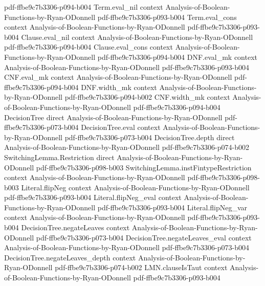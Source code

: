 \begin{theorem}
  {pdf-ffbe9c7b3306-p094-b004}
\proofstep
  {Term.eval_nil}
  {context}
  {Analysis-of-Boolean-Functions-by-Ryan-ODonnell}
  {pdf-ffbe9c7b3306-p093-b004}
\proofstep
  {Term.eval_cons}
  {context}
  {Analysis-of-Boolean-Functions-by-Ryan-ODonnell}
  {pdf-ffbe9c7b3306-p093-b004}
\proofstep
  {Clause.eval_nil}
  {context}
  {Analysis-of-Boolean-Functions-by-Ryan-ODonnell}
  {pdf-ffbe9c7b3306-p094-b004}
\proofstep
  {Clause.eval_cons}
  {context}
  {Analysis-of-Boolean-Functions-by-Ryan-ODonnell}
  {pdf-ffbe9c7b3306-p094-b004}
\proofstep
  {DNF.eval_mk}
  {context}
  {Analysis-of-Boolean-Functions-by-Ryan-ODonnell}
  {pdf-ffbe9c7b3306-p093-b004}
\proofstep
  {CNF.eval_mk}
  {context}
  {Analysis-of-Boolean-Functions-by-Ryan-ODonnell}
  {pdf-ffbe9c7b3306-p094-b004}
\proofstep
  {DNF.width_mk}
  {context}
  {Analysis-of-Boolean-Functions-by-Ryan-ODonnell}
  {pdf-ffbe9c7b3306-p094-b002}
\proofstep
  {CNF.width_mk}
  {context}
  {Analysis-of-Boolean-Functions-by-Ryan-ODonnell}
  {pdf-ffbe9c7b3306-p094-b004}
\proofstep
  {DecisionTree}
  {direct}
  {Analysis-of-Boolean-Functions-by-Ryan-ODonnell}
  {pdf-ffbe9c7b3306-p073-b004}
\proofstep
  {DecisionTree.eval}
  {context}
  {Analysis-of-Boolean-Functions-by-Ryan-ODonnell}
  {pdf-ffbe9c7b3306-p073-b004}
\proofstep
  {DecisionTree.depth}
  {direct}
  {Analysis-of-Boolean-Functions-by-Ryan-ODonnell}
  {pdf-ffbe9c7b3306-p074-b002}
\proofstep
  {SwitchingLemma.Restriction}
  {direct}
  {Analysis-of-Boolean-Functions-by-Ryan-ODonnell}
  {pdf-ffbe9c7b3306-p098-b003}
\proofstep
  {SwitchingLemma.instFintypeRestriction}
  {context}
  {Analysis-of-Boolean-Functions-by-Ryan-ODonnell}
  {pdf-ffbe9c7b3306-p098-b003}
\proofstep
  {Literal.flipNeg}
  {context}
  {Analysis-of-Boolean-Functions-by-Ryan-ODonnell}
  {pdf-ffbe9c7b3306-p093-b004}
\proofstep
  {Literal.flipNeg_eval}
  {context}
  {Analysis-of-Boolean-Functions-by-Ryan-ODonnell}
  {pdf-ffbe9c7b3306-p093-b004}
\proofstep
  {Literal.flipNeg_var}
  {context}
  {Analysis-of-Boolean-Functions-by-Ryan-ODonnell}
  {pdf-ffbe9c7b3306-p093-b004}
\proofstep
  {DecisionTree.negateLeaves}
  {context}
  {Analysis-of-Boolean-Functions-by-Ryan-ODonnell}
  {pdf-ffbe9c7b3306-p073-b004}
\proofstep
  {DecisionTree.negateLeaves_eval}
  {context}
  {Analysis-of-Boolean-Functions-by-Ryan-ODonnell}
  {pdf-ffbe9c7b3306-p073-b004}
\proofstep
  {DecisionTree.negateLeaves_depth}
  {context}
  {Analysis-of-Boolean-Functions-by-Ryan-ODonnell}
  {pdf-ffbe9c7b3306-p074-b002}
\proofstep
  {LMN.clauseIsTaut}
  {context}
  {Analysis-of-Boolean-Functions-by-Ryan-ODonnell}
  {pdf-ffbe9c7b3306-p093-b004}
\proofstep

\end{theorem}
